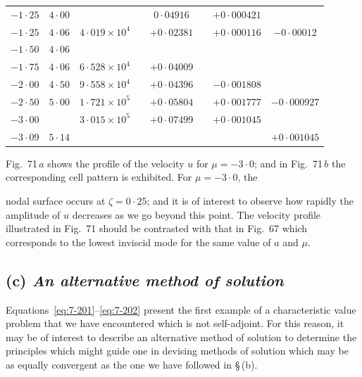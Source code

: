 \begin{table}[htbp]
\begin{tabular}{cccccccc}
$-1{\cdot}25$ & $4{\cdot}00$ & & & $0{\cdot}04916$ & & $+0{\cdot}000421$ & \\
$-1{\cdot}25$ & $4{\cdot}06$ & $4{\cdot}019\times 10^4$ & & $+0{\cdot}02381$ & & $+0{\cdot}000116$ & $-0{\cdot}00012$ \\
$-1{\cdot}50$ & $4{\cdot}06$ & & & & & & \\
$-1{\cdot}75$ & $4{\cdot}06$ & $6{\cdot}528\times 10^4$ & & $+0{\cdot}04009$ & & & \\
$-2{\cdot}00$ & $4{\cdot}50$ & $9{\cdot}558\times 10^4$ & & $+0{\cdot}04396$ & & $-0{\cdot}001808$ & \\
$-2{\cdot}50$ & $5{\cdot}00$ & $1{\cdot}721\times 10^5$ & & $+0{\cdot}05804$ & & $+0{\cdot}001777$ & $-0{\cdot}000927$ \\
$-3{\cdot}00$ & & $3{\cdot}015\times 10^5$ & & $+0{\cdot}07499$ & & $+0{\cdot}001045$ & \\
$-3{\cdot}09$ & $5{\cdot}14$ & & & & & & $+0{\cdot}001045$ \\
\hline
\end{tabular}
\end{table}

Fig.~71\,$a$ shows the profile of the velocity $u$ for $\mu = -3{\cdot}0$; and in Fig.~71\,$b$ the corresponding cell pattern is exhibited.  For $\mu = -3{\cdot}0$, the


nodal surface occurs at $\zeta = 0{\cdot}25$; and it is of interest to observe how
rapidly the amplitude of $u$ decreases as we go beyond this point.  The
velocity profile illustrated in Fig.~71 should be contrasted with that
in Fig.~67 which corresponds to the lowest inviscid mode for the same
value of $a$ and $\mu$.

\subsection*{(c) \emph{An alternative method of solution}}
Equations~\eqref{eq:7-201}--\eqref{eq:7-202} present the first example of a characteristic
value problem that we have encountered which is not self-adjoint.  For
this reason, it may be of interest to describe an alternative method of
solution to determine the principles which might guide one in devising
methods of solution which may be as equally convergent as the one we
have followed in \S\,(b).


